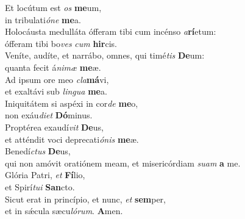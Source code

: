 \oddverse Et locútum est \textit{os} \textbf{me}um,~\*\\
\oddverse in tribulati\textit{ó}\textit{ne} \textbf{me}a.\\
\evenverse Holocáusta medulláta ófferam tibi cum incénso \textit{a}\textbf{rí}etum:~\*\\
\evenverse ófferam tibi bo\textit{ves} \textit{cum} \textbf{hir}cis.\\
\oddverse Veníte, audíte, et narrábo, omnes, qui timé\textit{tis} \textbf{De}um:~\*\\
\oddverse quanta fecit á\textit{ni}\textit{mæ} \textbf{me}æ.\\
\evenverse Ad ipsum ore meo \textit{cla}\textbf{má}vi,~\*\\
\evenverse et exaltávi sub \textit{lin}\textit{gua} \textbf{me}a.\\
\oddverse Iniquitátem si aspéxi in cor\textit{de} \textbf{me}o,~\*\\
\oddverse non exáu\textit{di}\textit{et} \textbf{Dó}minus.\\
\evenverse Proptérea exaudí\textit{vit} \textbf{De}us,~\*\\
\evenverse et atténdit voci deprecati\textit{ó}\textit{nis} \textbf{me}æ.\\
\oddverse Benedí\textit{ctus} \textbf{De}us,~\*\\
\oddverse qui non amóvit oratiónem meam, et misericórdiam \textit{su}\textit{am} \textbf{a} me.\\
\evenverse Glória Patri, \textit{et} \textbf{Fí}lio,~\*\\
\evenverse et Spirí\textit{tu}\textit{i} \textbf{San}cto.\\
\oddverse Sicut erat in princípio, et nunc, \textit{et} \textbf{sem}per,~\*\\
\oddverse et in sǽcula sæcu\textit{ló}\textit{rum}. \textbf{A}men.\\
